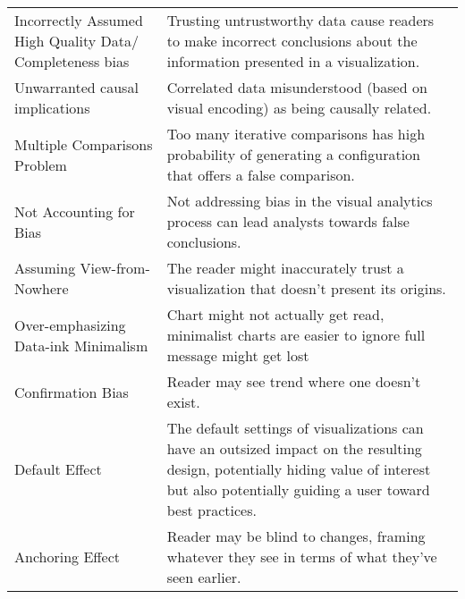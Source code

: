 \begin{table*}[]
\begin{tabular}{p{5cm}p{12cm}}
   \rowcolor{colord}\multirow{9}{0em}{\hspace{-0.6cm}\rotatebox{90}{\normalsize{Reading}}}Incorrectly Assumed High Quality Data/ Completeness bias & Trusting untrustworthy data cause readers to make incorrect conclusions about the information presented in a visualization. \cite{mayrTrust2019, sacha2015role}\\
 \rowcolor{colord-opaque}Unwarranted causal implications & Correlated data misunderstood (based on visual encoding) as being causally related. \cite{xiong2019illusion, few2019loom}\\
 \rowcolor{colord}Multiple Comparisons Problem & Too many iterative comparisons has high probability of generating a configuration that offers a false comparison. \cite{pu2018garden, zgraggen2018investigating}\\
 \rowcolor{colord-opaque}Not Accounting for Bias & Not addressing bias in the visual analytics process can lead analysts towards false conclusions. \cite{wall2017warning}\\
 \rowcolor{colord}Assuming View-from-Nowhere & The reader might inaccurately trust a visualization that doesn't present its origins. \cite{dignazio2019draft}\\
 \rowcolor{colord-opaque}Over-emphasizing Data-ink Minimalism & Chart might not actually get read, minimalist charts are easier to ignore full message might get lost \cite{bateman2010useful}\\
 \rowcolor{colord}Confirmation Bias & Reader may see trend where one doesn't exist. \cite{valdez2017framework, few2019loom}\\
 \rowcolor{colord-opaque}Default Effect & The default settings of visualizations can have an outsized impact on the resulting design, potentially hiding value of interest but  also potentially guiding a user toward best practices. \cite{shah2006policy,few2019loom, hullman2011visualization}\\
 \rowcolor{colord}Anchoring Effect & Reader may be blind to changes, framing whatever they see in terms of what they've seen earlier. \cite{ritchie2019lie, hullman2011visualization}\\
\end{tabular}
\label{table:mirage-table}
\end{table*}
